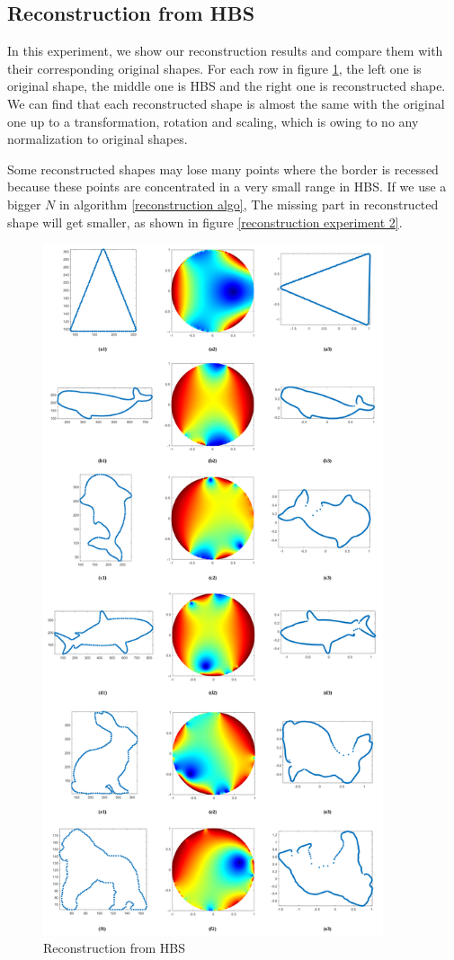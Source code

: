 \documentclass[review,onefignum,onetabnum]{siamonline190516}
\begin{document}
    \subsection{Reconstruction from HBS}
        In this experiment, we show our reconstruction results and compare them with their corresponding original shapes. For each row in figure \ref{reconstruction experiment 1}, the left one is original shape, the middle one is HBS and the right one is reconstructed shape. We can find that each reconstructed shape is almost the same with the original one up to a transformation, rotation and scaling, which is owing to no any normalization to original shapes.
        
        Some reconstructed shapes may lose many points where the border is recessed because these points are concentrated in a very small range in HBS. If we use a bigger $N$ in algorithm \ref{reconstruction algo}, The missing part in reconstructed shape will get smaller, as shown in figure \ref{reconstruction experiment 2}.

        \begin{figure}
            \begin{center}
                \includegraphics[width=10cm]{reconstruct.png}
            \end{center}
            \caption{Reconstruction from HBS}
            \label{reconstruction experiment 1}
        \end{figure}
\end{document}

